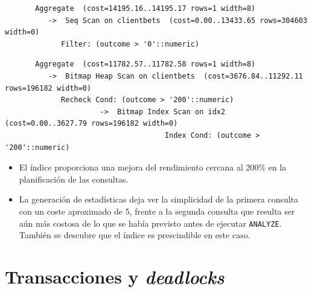 \documentclass{article}
\begin{document}
\begin{lstlisting}
       Aggregate  (cost=14195.16..14195.17 rows=1 width=8)
          ->  Seq Scan on clientbets  (cost=0.00..13433.65 rows=304603 width=0)
             Filter: (outcome > '0'::numeric)
\end{lstlisting}
\begin{lstlisting}
       Aggregate  (cost=11782.57..11782.58 rows=1 width=8)
          ->  Bitmap Heap Scan on clientbets  (cost=3676.84..11292.11 rows=196182 width=0)
             Recheck Cond: (outcome > '200'::numeric)
                      ->  Bitmap Index Scan on idx2  (cost=0.00..3627.79 rows=196182 width=0)
                                     Index Cond: (outcome > '200'::numeric)
\end{lstlisting}
\newpage
\begin{itemize}
    \item El índice proporciona una mejora del rendimiento cercana al 200\% en la planificación de las consultas.
    \item La generación de estadísticas deja ver la simplicidad de la primera consulta con un coste aproximado de 5, frente a la segunda consulta que resulta ser aún más costosa de lo que se había previsto antes de ejecutar \texttt{ANALYZE}. También se descubre que el índice es prescindible en este caso.
\end{itemize}
\section{Transacciones y \textit{deadlocks}}
\end{document}
